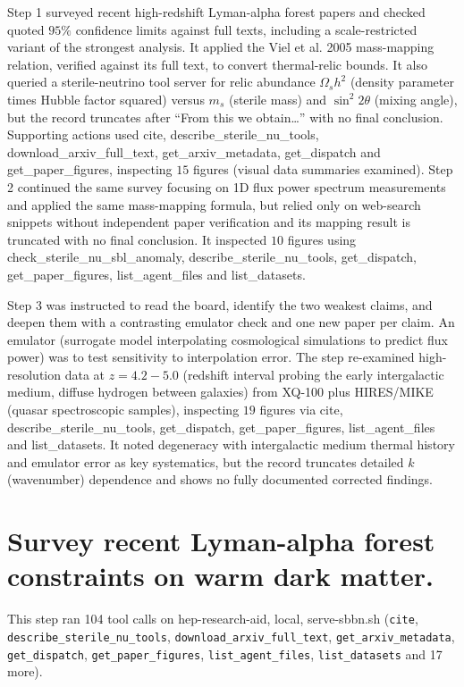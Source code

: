 \documentclass[11pt,a4paper]{article}
\begin{document}
Step 1 surveyed recent high-redshift Lyman-alpha forest papers and checked quoted $95\%$ confidence limits against full texts, including a scale-restricted variant of the strongest analysis. It applied the Viel et al. 2005 mass-mapping relation, verified against its full text, to convert thermal-relic bounds. It also queried a sterile-neutrino tool server for relic abundance $\Omega_s h^2$ (density parameter times Hubble factor squared) versus $m_s$ (sterile mass) and $\sin^2 2\theta$ (mixing angle), but the record truncates after ``From this we obtain\ldots{}'' with no final conclusion. Supporting actions used cite, describe\_sterile\_nu\_tools, download\_arxiv\_full\_text, get\_arxiv\_metadata, get\_dispatch and get\_paper\_figures, inspecting $15$ figures (visual data summaries examined). Step 2 continued the same survey focusing on 1D flux power spectrum measurements and applied the same mass-mapping formula, but relied only on web-search snippets without independent paper verification and its mapping result is truncated with no final conclusion. It inspected $10$ figures using check\_sterile\_nu\_sbl\_anomaly, describe\_sterile\_nu\_tools, get\_dispatch, get\_paper\_figures, list\_agent\_files and list\_datasets.

Step 3 was instructed to read the board, identify the two weakest claims, and deepen them with a contrasting emulator check and one new paper per claim. An emulator (surrogate model interpolating cosmological simulations to predict flux power) was to test sensitivity to interpolation error. The step re-examined high-resolution data at $z = 4.2-5.0$ (redshift interval probing the early intergalactic medium, diffuse hydrogen between galaxies) from XQ-100 plus HIRES/MIKE (quasar spectroscopic samples), inspecting $19$ figures via cite, describe\_sterile\_nu\_tools, get\_dispatch, get\_paper\_figures, list\_agent\_files and list\_datasets. It noted degeneracy with intergalactic medium thermal history and emulator error as key systematics, but the record truncates detailed $k$ (wavenumber) dependence and shows no fully documented corrected findings.

\section{Survey recent Lyman-alpha forest constraints on warm dark matter.}
This step ran 104 tool calls on hep-research-aid, local, serve-sbbn.sh (\texttt{cite}, \texttt{describe\_sterile\_nu\_tools}, \texttt{download\_arxiv\_full\_text}, \texttt{get\_arxiv\_metadata}, \texttt{get\_dispatch}, \texttt{get\_paper\_figures}, \texttt{list\_agent\_files}, \texttt{list\_datasets} and 17 more).\par
\end{document}
